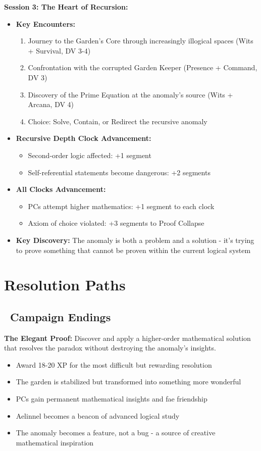 \documentclass[11pt]{article}
\begin{document}
\textbf{Session 3: The Heart of Recursion:}
\begin{itemize}
    \item \textbf{Key Encounters:}
    \begin{enumerate}
        \item Journey to the Garden's Core through increasingly illogical spaces (Wits + Survival, DV 3-4)
        \item Confrontation with the corrupted Garden Keeper (Presence + Command, DV 3)
        \item Discovery of the Prime Equation at the anomaly's source (Wits + Arcana, DV 4)
        \item Choice: Solve, Contain, or Redirect the recursive anomaly
    \end{enumerate}
    \item \textbf{Recursive Depth Clock Advancement:}
    \begin{itemize}
        \item Second-order logic affected: +1 segment
        \item Self-referential statements become dangerous: +2 segments
    \end{itemize}
    \item \textbf{All Clocks Advancement:}
    \begin{itemize}
        \item PCs attempt higher mathematics: +1 segment to each clock
        \item Axiom of choice violated: +3 segments to Proof Collapse
    \end{itemize}
    \item \textbf{Key Discovery:} The anomaly is both a problem and a solution - it's trying to prove something that cannot be proven within the current logical system
\end{itemize}

\section{Resolution Paths}

\subsection*{\faDoorOpen\ Campaign Endings}

\textbf{The Elegant Proof:}
Discover and apply a higher-order mathematical solution that resolves the paradox without destroying the anomaly's insights.
\begin{itemize}
    \item Award 18-20 XP for the most difficult but rewarding resolution
    \item The garden is stabilized but transformed into something more wonderful
    \item PCs gain permanent mathematical insights and fae friendship
    \item Aelinnel becomes a beacon of advanced logical study
    \item The anomaly becomes a feature, not a bug - a source of creative mathematical inspiration
\end{itemize}
\end{document}
